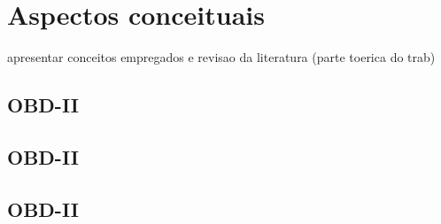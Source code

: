 \chapter{Aspectos conceituais}
\label{CAP2}


apresentar conceitos empregados e revisao da literatura (parte toerica do trab)


\section{OBD-II}
\section{OBD-II}
\section{OBD-II}

